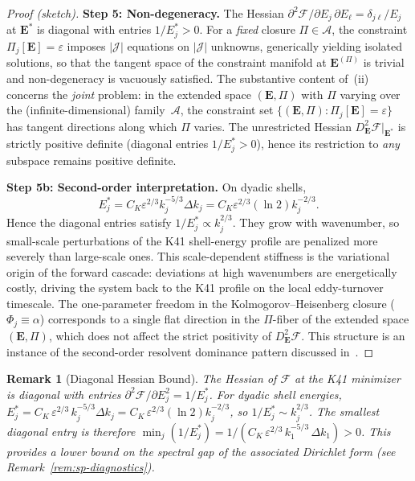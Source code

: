 \documentclass[12pt,a4paper]{article}
\theoremstyle{breakdef}
\theoremstyle{breakplain}
\theoremstyle{breakdef}
\newtheorem{remark}[definition]{Remark}
\begin{document}
\begin{proof}[Proof (sketch)]
\textbf{Step 5: Non-degeneracy.}\quad
The Hessian $\partial^2 \mathcal{F}/\partial E_j\,\partial E_\ell
= \delta_{j\ell}/E_j$ at $\mathbf{E}^*$ is diagonal with entries
$1/E_j^* > 0$.  For a \emph{fixed} closure $\Pi \in \mathscr{A}$, the
constraint $\Pi_j[\mathbf{E}] = \varepsilon$ imposes $|\mathcal{J}|$
equations on $|\mathcal{J}|$ unknowns, generically yielding isolated
solutions, so that the tangent space of the constraint manifold at
$\mathbf{E}^{(\Pi)}$ is trivial and non-degeneracy is vacuously satisfied.
The substantive content of~(ii) concerns the \emph{joint} problem: in the
extended space $(\mathbf{E}, \Pi)$ with $\Pi$ varying over the
(infinite-dimensional) family~$\mathscr{A}$, the constraint set
$\{(\mathbf{E}, \Pi) : \Pi_j[\mathbf{E}] = \varepsilon\}$ has tangent
directions along which $\Pi$ varies.  The unrestricted Hessian
$D^2_{\mathbf{E}}\mathcal{F}|_{\mathbf{E}^*}$ is strictly positive
definite (diagonal entries $1/E_j^* > 0$), hence its restriction to
\emph{any} subspace remains positive definite.

\medskip
\noindent\textbf{Step 5b: Second-order interpretation.}\quad
On dyadic shells,
\[
  E_j^*
  = C_K\varepsilon^{2/3}k_j^{-5/3}\Delta k_j
  = C_K\varepsilon^{2/3}(\ln2)k_j^{-2/3}.
\]
Hence the diagonal entries satisfy $1/E_j^* \propto k_j^{2/3}$.
They grow with wavenumber, so
small-scale perturbations of the K41 shell-energy profile are penalized more
severely than large-scale ones.  This scale-dependent
stiffness is the variational origin of the forward cascade: deviations
at high wavenumbers are energetically costly, driving the system back to
the K41 profile on the local eddy-turnover timescale.  The one-parameter
freedom in the Kolmogorov--Heisenberg closure ($\Phi_j \equiv \alpha$)
corresponds to a single flat direction in the $\Pi$-fiber of the
extended space $(\mathbf{E}, \Pi)$, which does not affect the strict
positivity of $D^2_{\mathbf{E}}\mathcal{F}$.  This structure is an
instance of the second-order resolvent dominance pattern discussed
in~\cite{FST-Unified2026}.
\end{proof}

\begin{remark}[Diagonal Hessian Bound]\label{rem:hessian}
The Hessian of $\mathcal{F}$ at the K41 minimizer is diagonal with entries $\partial^2\mathcal{F}/\partial E_j^2 = 1/E_j^*$. For dyadic shell energies,
$E_j^* = C_K\,\varepsilon^{2/3}\,k_j^{-5/3}\Delta k_j
= C_K\,\varepsilon^{2/3}(\ln2)k_j^{-2/3}$, so
$1/E_j^* \sim k_j^{2/3}$. The smallest diagonal entry is therefore
$\min_j(1/E_j^*) = 1/(C_K\,\varepsilon^{2/3}\,k_1^{-5/3}\,\Delta k_1) > 0$.
This provides a lower bound on the spectral gap of the associated Dirichlet
form (see Remark~\ref{rem:sp-diagnostics}).
\end{remark}
\end{document}
